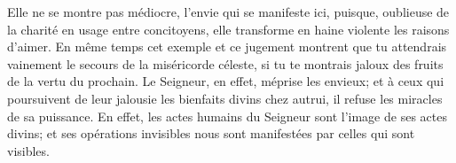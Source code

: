 Elle ne se montre pas médiocre, l’envie qui se manifeste ici,
	puisque, oublieuse de la charité en usage entre concitoyens,
	elle transforme en haine violente les raisons d’aimer.
En même temps cet exemple et ce jugement montrent
	que tu attendrais vainement le secours de la miséricorde céleste,
	si tu te montrais jaloux des fruits de la vertu du prochain.
Le Seigneur, en effet, méprise les envieux;
	et à ceux qui poursuivent de leur jalousie les bienfaits divins chez autrui,
	il refuse les miracles de sa puissance.
En effet, les actes humains du Seigneur sont l’image de ses actes divins;
	et ses opérations invisibles
	nous sont manifestées par celles qui sont visibles.
